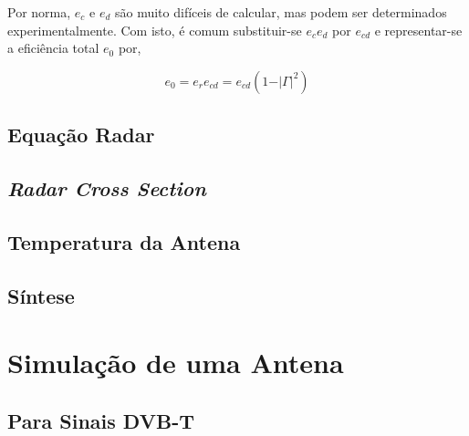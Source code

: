 Por norma, $e_{c}$ e $e_{d}$ são muito difíceis de calcular, mas podem ser determinados experimentalmente. Com isto, é comum substituir-se $e_{c}e_{d}$ por $e_{cd}$ e representar-se a eficiência total $e_{0}$ por,

\begin{equation} \label{3.22}
e_{0}=e_{r}e_{cd}=e_{cd}\left( 1-\vert\Gamma\vert^{2}\right)
\end{equation}






\subsection*{Equação Radar}



\subsection*{\textit{Radar Cross Section}}



\subsection*{Temperatura da Antena}


\subsection*{Síntese}




\section{Simulação de uma Antena}


\subsection{Para Sinais DVB-T}

